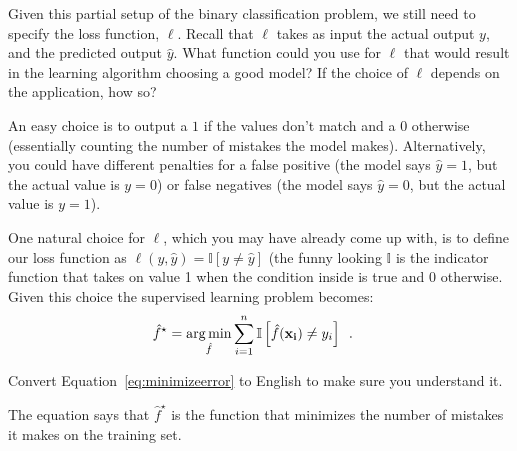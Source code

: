 \documentclass[assignment04_Solutions]{subfiles}
\begin{document}
\vspace{1em}
\begin{exercise}[(10 minutes)]
\bes
\item Given this partial setup of the binary classification problem, we still need to specify the loss function, $\ell$.  Recall that $\ell$ takes as input the actual output $y$, and the predicted output $\hat{y}$.  What function could you use for $\ell$ that would result in the learning algorithm choosing a good model?  If the choice of $\ell$ depends on the application, how so?

\begin{boxedsolution}
An easy choice is to output a $1$ if the values don't match and a $0$ otherwise (essentially counting the number of mistakes the model makes).  Alternatively, you could have different penalties for a false positive (the model says $\hat{y} = 1$, but the actual value is $y = 0$) or false negatives (the model says $\hat{y} = 0$, but the actual value is $y = 1$). 
\end{boxedsolution}

\item \label{ex:minmistakes}
One natural choice for $\ell$, which you may have already come up with, is to define our loss function as $\ell(y, \hat{y}) = \mathbb{I}[y \neq \hat{y}]$ (the funny looking $\mathbb{I}$ is the indicator function that takes on value 1 when the condition inside is true and 0 otherwise.  Given this choice the supervised learning problem becomes:
\begin{align}
\hat{f}^\star &= \operatorname*{arg\,min}_{\hat{f}} \sum_{i=1}^n \mathbb{I} \left [  \hat{f}(\mathbf{x_i}) \neq y_i\right ] \enspace . \label{eq:minimizeerror}
\end{align}

Convert Equation~\ref{eq:minimizeerror} to English to make sure you understand it.
\begin{boxedsolution}
The equation says that $\hat{f}^\star$ is the function that minimizes the number of mistakes it makes on the training set.
\end{boxedsolution}

\ees

\end{exercise}
\end{document}
